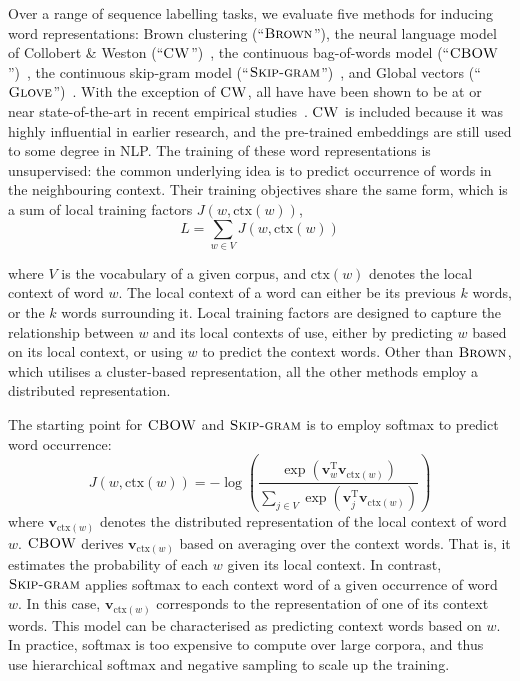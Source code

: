 \documentclass[11pt]{article}
\newcommand{\method}[2][]{\ensuremath{\textsc{#2#1}}\xspace}
\newcommand{\brown}[1][]{\method[\ensuremath{_{#1}}]{Brown}}
\newcommand{\CW}[1][]{\method[#1]{CW}}
\newcommand{\CBOW}[1][]{\method[#1]{CBOW}}
\newcommand{\Skipgram}[1][]{\method[#1]{Skip-gram}}
\newcommand{\Glove}[1][]{\method[#1]{Glove}}
\newcommand{\ctx}{\ensuremath{\text{ctx}}}
\begin{document}
Over a range of sequence labelling tasks, we evaluate five methods for
inducing word representations: Brown clustering
\cite{Brown92class-basedn-gram} (``\brown''), the neural language model
of Collobert \& Weston (``\CW'')~\cite{collobert2011natural}, the
continuous bag-of-words model (``\CBOW'')~\cite{Mikolov13}, the continuous
skip-gram model (``\Skipgram'')~\cite{Mikolov13NIPS}, and Global vectors
(``\Glove'')~\cite{pennington2014glove}. With the exception of \CW, all have
have been shown to be at or near state-of-the-art in recent empirical
studies~\cite{turian2010word,pennington2014glove}. \CW is included
because it was highly influential in earlier research, and the pre-trained embeddings are
still used to some degree in NLP. The training of these word
representations is unsupervised: the common underlying idea is to
predict occurrence of words in the neighbouring context. Their training
objectives share the same form, which is a sum of local training factors
$J(w, \text{ctx}(w))$,  
\begin{displaymath}
  L = \sum_{w \in V} J(w, \ctx(w))
\end{displaymath}

where $V$ is the vocabulary of a given corpus, and $\ctx(w)$ denotes the
local context of word $w$.
The local context of a word can either be its previous $k$ words, or the
$k$ words surrounding it. 
Local training factors are designed to capture the relationship between
$w$ and its local contexts of use, either by predicting $w$
based on its local context, or using $w$ to predict the
context words. Other than \brown, which utilises a cluster-based
representation, all the other methods employ a distributed representation.

The starting point for \CBOW and \Skipgram is to employ softmax to predict word occurrence:
\begin{displaymath}
  J(w, \ctx(w)) = - \log \left( \frac{\exp(\mathbf{v}_w^{\text{T}} \mathbf{v}_{\ctx(w)})}{ \sum_{j \in V} \exp(\mathbf{v}_j^{\text{T}} \mathbf{v}_{\ctx(w)})} \right)
\end{displaymath}
where $\mathbf{v}_{\ctx(w)}$ denotes the distributed representation of
the local context of word $w$. \CBOW derives $\mathbf{v}_{\ctx(w)}$
based on averaging over the context words. That is, it estimates the
probability of each $w$ given its local
context. In contrast, \Skipgram applies softmax to each context word of
a given occurrence of word $w$. In this case, $\mathbf{v}_{\ctx(w)}$ corresponds to the
representation of one of its context words. This model can be characterised as
predicting context words based on $w$. In practice, softmax is
too expensive to compute over large corpora, and thus~ use
hierarchical softmax and negative sampling to scale up the training.
\end{document}

